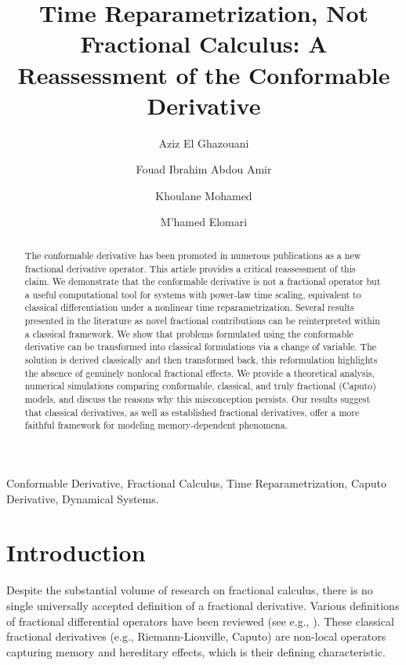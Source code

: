 \documentclass[preprint,12pt]{elsarticle}
\begin{document}
\begin{frontmatter}

\title{Time Reparametrization, Not Fractional Calculus: A Reassessment of the Conformable Derivative}

\author[label1]{Aziz El Ghazouani}
\author[label1]{Fouad Ibrahim Abdou Amir}
\author[label1]{Khoulane Mohamed}
\author[label1]{M'hamed Elomari}

\begin{abstract} The conformable derivative has been promoted in numerous publications as a new fractional derivative operator. This article provides a critical reassessment of this claim. We demonstrate that the conformable derivative is not a fractional operator but a useful computational tool for systems with power-law time scaling, equivalent to classical differentiation under a nonlinear time reparametrization. Several results presented in the literature as novel fractional contributions can be reinterpreted within a classical framework. We show that problems formulated using the conformable derivative can be transformed into classical formulations via a change of variable. The solution is derived classically and then transformed back, this reformulation highlights the absence of genuinely nonlocal fractional effects. We provide a theoretical analysis, numerical simulations comparing conformable, classical, and truly fractional (Caputo) models, and discuss the reasons why this misconception persists. Our results suggest that classical derivatives, as well as established fractional derivatives,
offer a more faithful framework for modeling memory-dependent phenomena. 
\end{abstract}

\begin{keyword} Conformable Derivative, Fractional Calculus, Time Reparametrization, Caputo Derivative, Dynamical Systems.
\end{keyword}
\end{frontmatter}
\section{Introduction}
Despite the substantial volume of research on fractional calculus, there is no single universally accepted definition of a fractional derivative. Various definitions of fractional differential operators have been reviewed (see e.g., \cite{Giusti,Kilbas,Ortigueira,Ortigueira2,Ortigueira3,Tarasov,Tarasov2,de}). These classical fractional derivatives (e.g., Riemann-Liouville, Caputo) are non-local operators capturing memory and hereditary effects, which is their defining characteristic.
\end{document}
